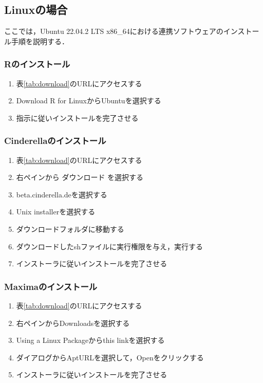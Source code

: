 \newpage

\subsection{Linuxの場合}

ここでは，Ubuntu 22.04.2 LTS x86\_64における連携ソフトウェアのインストール手順を説明する．

\subsubsection{Rのインストール}
\begin{enumerate}
    \item 表\ref{tab:download}のURLにアクセスする
    \item Download R for LinuxからUbuntuを選択する
    \item 指示に従いインストールを完了させる
\end{enumerate}

\subsubsection{Cinderellaのインストール}
\begin{enumerate}
    \item 表\ref{tab:download}のURLにアクセスする
    \item 右ペインから ダウンロード を選択する
    \item beta.cinderella.deを選択する
    \item Unix installerを選択する
    \item ダウンロードフォルダに移動する
    \item ダウンロードしたshファイルに実行権限を与え，実行する
    \item インストーラに従いインストールを完了させる
\end{enumerate}

\subsubsection{Maximaのインストール}
\begin{enumerate}
    \item 表\ref{tab:download}のURLにアクセスする
    \item 右ペインからDownloadsを選択する
    \item Using a Linux Packageからthis linkを選択する
    \item ダイアログからAptURLを選択して，Openをクリックする
    \item インストーラに従いインストールを完了させる
\end{enumerate}

